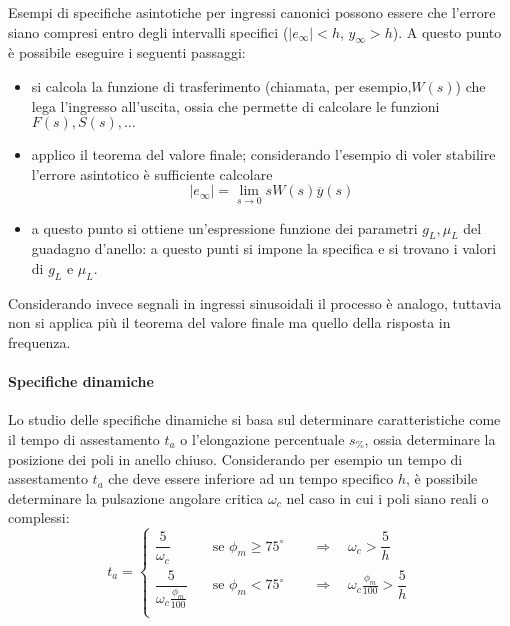 		\vspace{3mm}
		
		Esempi di specifiche asintotiche per ingressi canonici possono essere che l'errore siano compresi entro degli intervalli specifici ($|e_\infty| <h$, $y_\infty > h$). A questo punto è possibile eseguire i seguenti passaggi:
		\begin{itemize}
			\item si calcola la funzione di trasferimento (chiamata, per esempio,$W(s)$) che lega l'ingresso all'uscita, ossia che permette di calcolare le funzioni $F(s), S(s), \dots$
			\item applico il teorema del valore finale; considerando l'esempio di voler stabilire l'errore asintotico è sufficiente calcolare
			\[ |e_\infty| = \lim_{s\rightarrow 0} s W(s) \overline y(s) \]
			\item a questo punto si ottiene un'espressione funzione dei parametri $g_L,\mu_L$ del guadagno d'anello: a questo punti si impone la specifica e si trovano i valori di $g_L$ e $\mu_L$.
		\end{itemize}
		
		\vspace{3mm}
		
		Considerando invece segnali in ingressi sinusoidali il processo è analogo, tuttavia non si applica più il teorema del valore finale ma quello della risposta in frequenza.
		
		\paragraph{Specifiche dinamiche} Lo studio delle specifiche dinamiche si basa sul determinare caratteristiche come il tempo di assestamento $t_a$ o l'elongazione percentuale $s_\%$, ossia determinare la posizione dei poli in anello chiuso. Considerando per esempio un tempo di assestamento $t_a$ che deve essere inferiore ad un tempo specifico $h$, è possibile determinare la pulsazione angolare critica $\omega_c$ nel caso in cui i poli siano reali o complessi:
		\[ t_a = \begin{cases}
			\dfrac{5}{\omega_c} \quad &\textrm{se } \phi_m \geq 75^\circ \qquad \Rightarrow \quad \omega_c > \dfrac{5}{h} \\
			\dfrac{5}{\omega_c \frac{\phi_m}{100}} \quad &\textrm{se } \phi_m < 75^\circ \qquad \Rightarrow \quad \omega_c \frac{\phi_m}{100} > \dfrac{5}{h} \\
		\end{cases} \]
				
